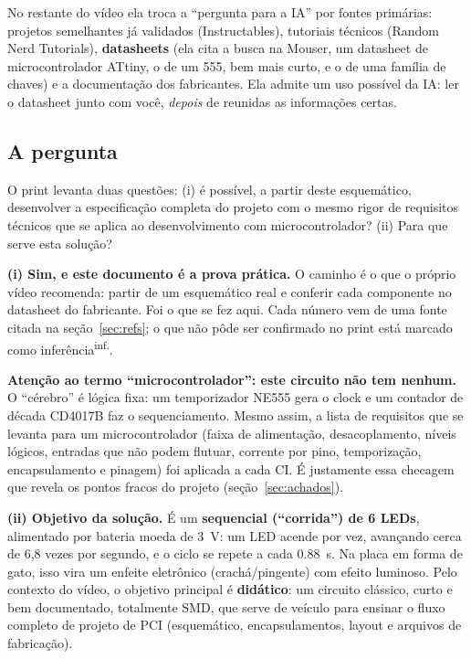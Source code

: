 \documentclass[11pt,a4paper]{article}
\newcommand{\inferido}{\textsuperscript{\textcolor{douradoEsc}{\sffamily inf.}}}
\begin{document}
No restante do vídeo ela troca a “pergunta para a IA” por fontes primárias: projetos
semelhantes já validados (Instructables), tutoriais técnicos (Random Nerd Tutorials),
\textbf{datasheets} (ela cita a busca na Mouser, um datasheet de microcontrolador ATtiny,
o de um 555, bem mais curto, e o de uma família de chaves) e a documentação dos
fabricantes. Ela admite um uso possível da IA: ler o datasheet junto com você,
\emph{depois} de reunidas as informações certas.

\subsection{A pergunta}

O print levanta duas questões: (i) é possível, a partir deste esquemático, desenvolver a
especificação completa do projeto com o mesmo rigor de requisitos técnicos que se aplica
ao desenvolvimento com microcontrolador? (ii) Para que serve esta solução?

\begin{resposta}
\textbf{(i) Sim, e este documento é a prova prática.} O caminho é o que o próprio vídeo
recomenda: partir de um esquemático real e conferir cada componente no datasheet do
fabricante. Foi o que se fez aqui. Cada número vem de uma fonte citada na
seção~\ref{sec:refs}; o que não pôde ser confirmado no print está marcado como
inferência\inferido.

\textbf{Atenção ao termo “microcontrolador”: este circuito não tem nenhum.} O
“cérebro” é lógica fixa: um temporizador NE555 gera o clock e um contador de década
CD4017B faz o sequenciamento. Mesmo assim, a lista de requisitos que se levanta para um
microcontrolador (faixa de alimentação, desacoplamento, níveis lógicos, entradas que
não podem flutuar, corrente por pino, temporização, encapsulamento e pinagem) foi
aplicada a cada CI. É justamente essa checagem que revela os pontos fracos do projeto
(seção~\ref{sec:achados}).

\textbf{(ii) Objetivo da solução.} É um \textbf{sequencial (“corrida”) de 6 LEDs},
alimentado por bateria moeda de \SI{3}{\volt}: um LED acende por vez, avançando cerca de
6,8 vezes por segundo, e o ciclo se repete a cada \SI{0,88}{\second}. Na placa em forma de
gato, isso vira um enfeite eletrônico (crachá/pingente) com efeito luminoso.
Pelo contexto do vídeo, o objetivo principal é \textbf{didático}: um circuito clássico,
curto e bem documentado, totalmente SMD, que serve de veículo para ensinar o fluxo
completo de projeto de PCI (esquemático, encapsulamentos, layout e arquivos de fabricação).
\end{resposta}
\end{document}
